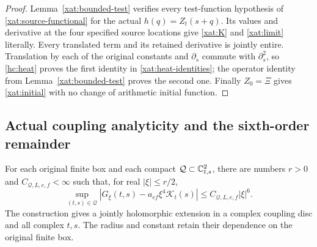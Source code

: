 \begin{proof}
Lemma~\ref{xat:bounded-test} verifies every test-function hypothesis
of \eqref{xat:source-functional} for the actual
\(h(q)=Z_t(s+q)\). Its values and derivative at the four specified
source locations give \eqref{xat:K} and \eqref{xat:limit}
literally. Every translated term and its retained derivative is
jointly entire. Translation by each of the original constants and
\(\partial_s\) commute with \(\partial_s^2\), so
\eqref{hc:heat} proves the first identity in
\eqref{xat:heat-identities}; the operator identity from
Lemma~\ref{xat:bounded-test} proves the second one. Finally
\(Z_0=\Xi\) gives \eqref{xat:initial} with no change of arithmetic
initial function.
\end{proof}

\subsection{Actual coupling analyticity and the sixth-order remainder}

\begin{proposition}
\label{xat:remainder}
For each original finite box and each compact
\(\mathcal Q\subset\mathbb C^2_{t,s}\), there are numbers
\(r>0\) and \(C_{\mathcal Q,L,e,f}<\infty\) such that, for real
\(|\xi|\leq r/2\),
\begin{equation}
\sup_{(t,s)\in\mathcal Q}
 |G_\xi(t,s)-a_{ef}\xi^4\mathcal K_t(s)|
 \leq C_{\mathcal Q,L,e,f}|\xi|^6.
\label{xat:uniform-remainder}
\end{equation}
The construction gives a jointly holomorphic extension in a complex
coupling disc and all complex \(t,s\). The radius and constant
retain their dependence on the original finite box.
\end{proposition}

